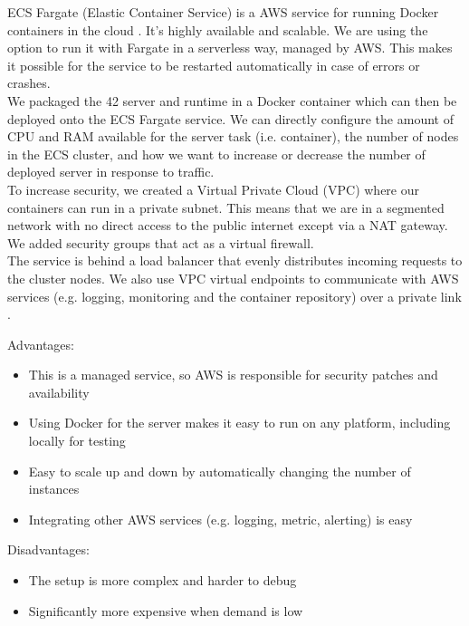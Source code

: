 ECS Fargate (Elastic Container Service) is a AWS service for running Docker containers in the cloud \cite{amazon-2022E}. It's highly available and scalable. We are using the option to run it with Fargate in a serverless way, managed by AWS. This makes it possible for the service to be restarted automatically in case of errors or crashes.
\\[12pt]
We packaged the 42 server and runtime in a Docker container which can then be deployed onto the ECS Fargate service. We can directly configure the amount of CPU and RAM available for the server task (i.e. container), the number of nodes in the ECS cluster, and how we want to increase or decrease the number of deployed server in response to traffic.
\\[12pt]
To increase security, we created a Virtual Private Cloud (VPC) where our containers can run in a private subnet. This means that we are in a segmented network with no direct access to the public internet except via a NAT gateway. We added security groups that act as a virtual firewall.
\\[12pt]
The service is behind a load balancer that evenly distributes incoming requests to the cluster nodes. We also use VPC virtual endpoints to communicate with AWS services (e.g. logging, monitoring and the container repository) over a private link \cite{amazon-2022F}.


Advantages:
\begin{itemize}
\item This is a managed service, so AWS is responsible for security patches and availability
\item Using Docker for the server makes it easy to run on any platform, including locally for testing
\item Easy to scale up and down by automatically changing the number of instances
\item Integrating other AWS services (e.g. logging, metric, alerting) is easy
\end{itemize}

Disadvantages:
\begin{itemize}
\item The setup is more complex and harder to debug
\item Significantly more expensive when demand is low
\end{itemize}

